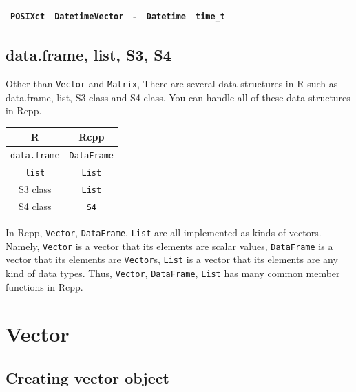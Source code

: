 \documentclass[
]{book}
\begin{document}
\begin{longtable}[]{@{}cccccc@{}}
\begin{minipage}[t]{0.14\columnwidth}
\texttt{POSIXct}\strut
\end{minipage} & \begin{minipage}[t]{0.14\columnwidth}\centering
\texttt{DatetimeVector}\strut
\end{minipage} & \begin{minipage}[t]{0.14\columnwidth}\centering
-\strut
\end{minipage} & \begin{minipage}[t]{0.14\columnwidth}\centering
\texttt{Datetime}\strut
\end{minipage} & \begin{minipage}[t]{0.14\columnwidth}\centering
\texttt{time\_t}\strut
\end{minipage}\tabularnewline
\bottomrule
\end{longtable}

\hypertarget{data.frame-list-s3-s4}{%
\section{data.frame, list, S3, S4}\label{data.frame-list-s3-s4}}

Other than \texttt{Vector} and \texttt{Matrix}, There are several data structures in R such as data.frame, list, S3 class and S4 class. You can handle all of these data structures in Rcpp.

\begin{longtable}[]{@{}cc@{}}
\toprule
R & Rcpp\tabularnewline
\midrule
\endhead
\texttt{data.frame} & \texttt{DataFrame}\tabularnewline
\texttt{list} & \texttt{List}\tabularnewline
S3 class & \texttt{List}\tabularnewline
S4 class & \texttt{S4}\tabularnewline
\bottomrule
\end{longtable}

In Rcpp, \texttt{Vector}, \texttt{DataFrame}, \texttt{List} are all implemented as kinds of vectors. Namely, \texttt{Vector} is a vector that its elements are scalar values, \texttt{DataFrame} is a vector that its elements are \texttt{Vector}s, \texttt{List} is a vector that its elements are any kind of data types. Thus, \texttt{Vector}, \texttt{DataFrame}, \texttt{List} has many common member functions in Rcpp.

\hypertarget{vector}{%
\chapter{Vector}\label{vector}}

\hypertarget{creating-vector-object}{%
\section{Creating vector object}\label{creating-vector-object}}
\end{document}
